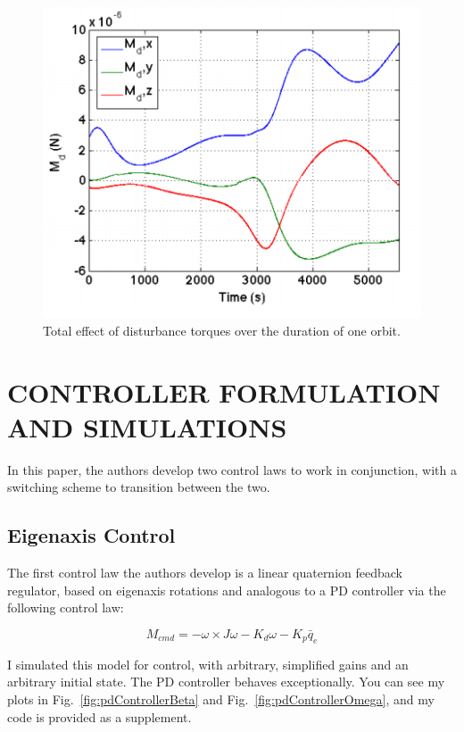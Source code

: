 \documentclass[letterpaper, 11 pt, conference]{ieeeconf}  %
\begin{document}
\begin{figure}
  \centering
  \includegraphics[width=\linewidth]{total_moment_on_satellite}
  \caption{Total effect of disturbance torques over the duration of one orbit.}
  \label{fig:dist_torques}
\end{figure}

\section{CONTROLLER FORMULATION AND SIMULATIONS}

In this paper, the authors develop two control laws to work in conjunction, with a switching scheme to transition between the two.

\subsection{Eigenaxis Control}

The first control law the authors develop is a linear quaternion feedback regulator, based on eigenaxis rotations and analogous to a PD controller via the following control law:

\[
M_{cmd} = -\omega \times J \omega - K_{d} \omega - K_{p} \bar{q}_{e}
\]

I simulated this model for control, with arbitrary, simplified gains and an arbitrary initial state. The PD controller behaves exceptionally. You can see my plots in Fig.~\ref{fig:pdControllerBeta} and Fig.~\ref{fig:pdControllerOmega}, and my code is provided as a supplement.
\end{document}
